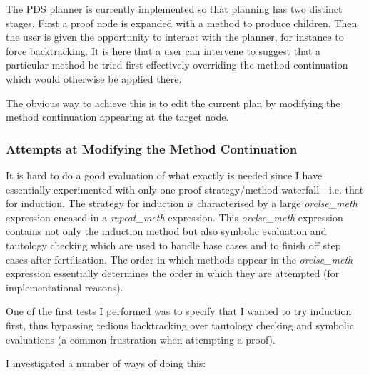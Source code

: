 The PDS planner is currently implemented so that
planning has two distinct stages.  First a proof node is expanded with a method to produce children.  Then the user
is given the opportunity to interact with the planner, for instance to
force backtracking.  It is here that a user can intervene to suggest
that a particular method be tried first effectively overriding the
method continuation which would otherwise be applied there.

The obvious way to achieve this is to edit the
current plan by 
modifying the method continuation appearing
at the target node. 

\subsubsection{Attempts at Modifying the Method
  Continuation} It is hard to do a good
evaluation of what exactly is needed since I have essentially
experimented with only one proof strategy/method
waterfall - i.e. that
for induction.  The strategy for induction is
characterised by a large {\em orelse\_meth}
expression encased in a {\em repeat\_meth}
expression.  This {\em orelse\_meth} expression contains not only the
induction method but also symbolic
evaluation and tautology
checking which are used to handle base
cases and to finish off step cases
after fertilisation.  The order in which methods
appear in the {\em orelse\_meth} expression essentially determines the
order in which they are attempted (for implementational reasons).

One of the first tests I performed was to specify that I wanted to try 
induction first, thus bypassing tedious backtracking
over tautology 
checking and symbolic
evaluations (a common frustration when
attempting a proof).  

I investigated a number of ways of doing this:


